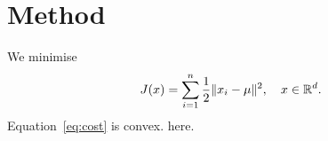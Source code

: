 \section{Method}
\label{sec:method}
We minimise
\begin{equation}
  J(x) = \sum_{i=1}^{n} \frac{1}{2} \lVert x_i - \mu \rVert^2, \quad x \in \mathbb{R}^d .
  \label{eq:cost}
\end{equation}
Equation~\eqref{eq:cost} is convex. \undefinedcommand here.
